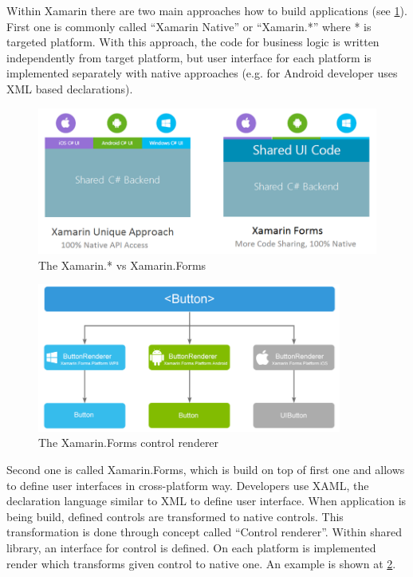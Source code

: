 Within Xamarin there are two main approaches how to build applications (see \cref{fig:xamarin-native-vs-forms}). First one is commonly called ``Xamarin Native'' or ``Xamarin.*'' where * is targeted platform. With this approach, the code for business logic is written independently from target platform, but user interface for each platform is implemented separately with native approaches (e.g. for Android developer uses XML based declarations).

\begin{figure}[ht!]
\centering
\includegraphics[width=12cm,keepaspectratio]{img/xamarin-vs-xamarin-forms}
\caption{The Xamarin.* vs Xamarin.Forms \cite{xamarin-native-forms}}
\label{fig:xamarin-native-vs-forms}
\end{figure}

\begin{figure}[ht!]
\centering
\includegraphics[width=10cm,keepaspectratio]{img/xamarin-forms-ui-render}
\caption{The Xamarin.Forms control renderer \cite{xamarin-native-forms}}
\label{fig:xamarin-ui-renderer}
\end{figure}

Second one is called Xamarin.Forms, which is build on top of first one and allows to define user interfaces in cross-platform way. Developers use XAML, the declaration language similar to XML to define user interface. When application is being build, defined controls are transformed to native controls. This transformation is done through concept called ``Control renderer''. Within shared library, an interface for control is defined. On each platform is implemented render which transforms given control to native one. An example is shown at \cref{fig:xamarin-ui-renderer}.
